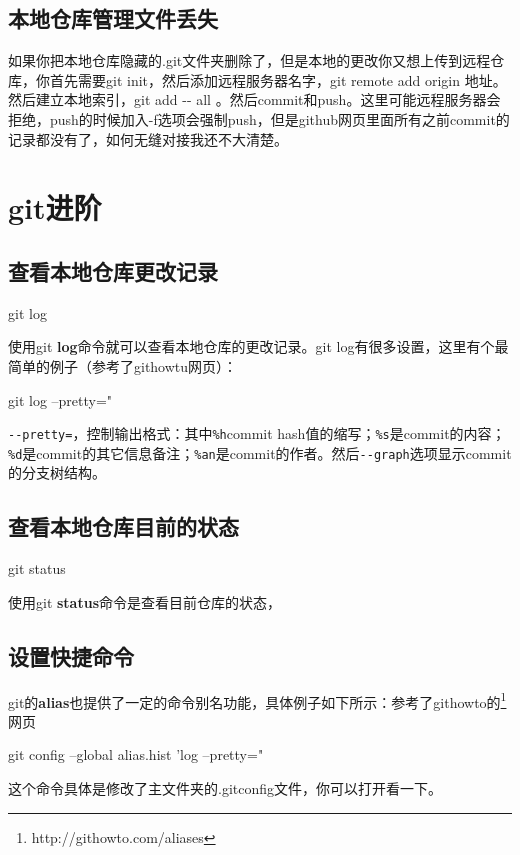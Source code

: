 \documentclass[11pt,oneside]{book}
\begin{document}
\section{本地仓库管理文件丢失}
如果你把本地仓库隐藏的.git文件夹删除了，但是本地的更改你又想上传到远程仓库，你首先需要git init，然后添加远程服务器名字，git remote add origin 地址。然后建立本地索引，git add -{}- all  。然后commit和push。这里可能远程服务器会拒绝，push的时候加入-f选项会强制push，但是github网页里面所有之前commit的记录都没有了，如何无缝对接我还不大清楚。

\chapter{git进阶}
\section{查看本地仓库更改记录}
\begin{tcbbash}[]
git log
\end{tcbbash}

使用git \textbf{log}命令就可以查看本地仓库的更改记录。git log有很多设置，这里有个最简单的例子（参考了githowtu网页）：
\begin{tcbbash}[]
git log --pretty="%
\end{tcbbash}

\verb+--pretty=+，控制输出格式：其中\verb+%h+commit hash值的缩写；\verb+%s+是commit的内容；\verb+%d+是commit的其它信息备注；\verb+%an+是commit的作者。然后\verb+--graph+选项显示commit的分支树结构。

\section{查看本地仓库目前的状态}
\begin{tcbbash}[]
git status
\end{tcbbash}

使用git \textbf{status}命令是查看目前仓库的状态，

\section{设置快捷命令}
git的\textbf{alias}也提供了一定的命令别名功能，具体例子如下所示：参考了githowto的\footnote{http://githowto.com/aliases}{网页}

\begin{tcbbash}[]
git config --global alias.hist 
    'log --pretty="%
\end{tcbbash}
这个命令具体是修改了主文件夹的.gitconfig文件，你可以打开看一下。
\end{document}
